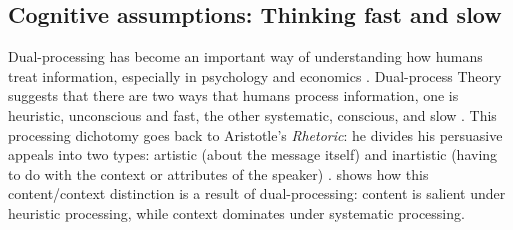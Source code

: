 \documentclass[12 pt]{article}
\begin{document}
\subsection{Cognitive assumptions: Thinking fast and slow }
Dual-processing has become an important way of understanding how humans treat information, especially in psychology and economics \parencite{Evans2008}. Dual-process Theory suggests that there are two ways that humans process information, one is heuristic, unconscious and fast, the other systematic, conscious, and slow \parencite{Chaiken1980,Evans2008,Kahneman2011}. This processing dichotomy goes back to Aristotle's \textit{Rhetoric}: he divides his persuasive appeals into two types: artistic (about the message itself) and inartistic (having to do with the context or attributes of the speaker)  \parencite{Aristotle1954,Littlejohn1983}. \textcite{Chaiken1980} shows how this content/context distinction is a result of dual-processing: content is salient under heuristic processing, while context dominates under systematic processing.
\end{document}
